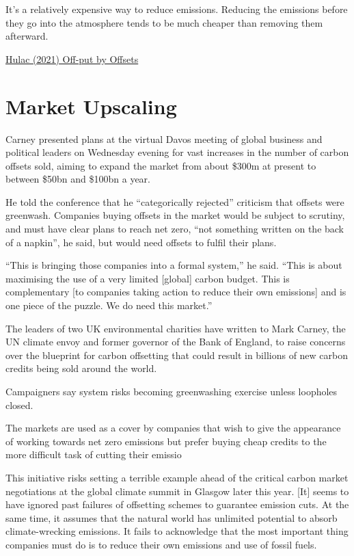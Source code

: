 \documentclass[
]{book}
\begin{document}
It's a relatively expensive way to reduce emissions. Reducing the emissions before they go into the atmosphere tends to be much cheaper than removing them afterward.

\href{https://www.rollcall.com/2021/05/05/off-put-by-offsets-why-some-advocates-doubt-net-zero-pledges/}{Hulac (2021) Off-put by Offsets}

\hypertarget{market-upscaling}{%
\section{Market Upscaling}\label{market-upscaling}}

Carney presented plans at the virtual Davos meeting of global business and political leaders on Wednesday evening for vast increases in the number of carbon offsets sold, aiming to expand the market from about \$300m at present to between \$50bn and \$100bn a year.

He told the conference that he ``categorically rejected'' criticism that offsets were greenwash. Companies buying offsets in the market would be subject to scrutiny, and must have clear plans to reach net zero, ``not something written on the back of a napkin'', he said, but would need offsets to fulfil their plans.

``This is bringing those companies into a formal system,'' he said. ``This is about maximising the use of a very limited {[}global{]} carbon budget. This is complementary {[}to companies taking action to reduce their own emissions{]} and is one piece of the puzzle. We do need this market.''

The leaders of two UK environmental charities have written to Mark Carney, the UN climate envoy and former governor of the Bank of England, to raise concerns over the blueprint for carbon offsetting that could result in billions of new carbon credits being sold around the world.

Campaigners say system risks becoming greenwashing exercise unless loopholes closed.

The markets are used as a cover by companies that wish to give the appearance of working towards net zero emissions but prefer buying cheap credits to the more difficult task of cutting their emissio

This initiative risks setting a terrible example ahead of the critical carbon market negotiations at the global climate summit in Glasgow later this year. {[}It{]} seems to have ignored past failures of offsetting schemes to guarantee emission cuts. At the same time, it assumes that the natural world has unlimited potential to absorb climate-wrecking emissions. It fails to acknowledge that the most important thing companies must do is to reduce their own emissions and use of fossil fuels.
\end{document}
